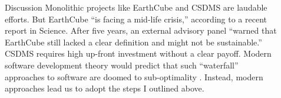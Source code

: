 \documentclass[final]{beamer}
\newlength{\sepwid}
\newlength{\onecolwid}
\newlength{\twocolwid}
\begin{document}
\begin{frame}[t]
\begin{columns}[t]
\begin{column}{\twocolwid}
\begin{columns}[t,totalwidth=\twocolwid]
\begin{column}{\onecolwid}

\end{column} %

\end{columns} %

\end{column} %

\begin{column}{\sepwid}\end{column} %

\begin{column}{\onecolwid} %


\begin{block}{Discussion}
    Monolithic projects like EarthCube and CSDMS are laudable efforts. But EarthCube ``is facing a mid-life crisis,''
    according to a recent report in Science. After five years, an external advisory panel ``warned that EarthCube
    still lacked a clear definition and might not be sustainable.''\cite{Witze2016} CSDMS requires high up-front investment without a
    clear payoff. Modern software development theory would predict that such ``waterfall'' approaches to software are
    doomed to sub-optimality \cite{Sutherland2014}. Instead, modern approaches lead us to adopt the steps I outlined above.
\end{block}


%
%


\end{column}
\end{columns}
\end{frame}
\end{document}
